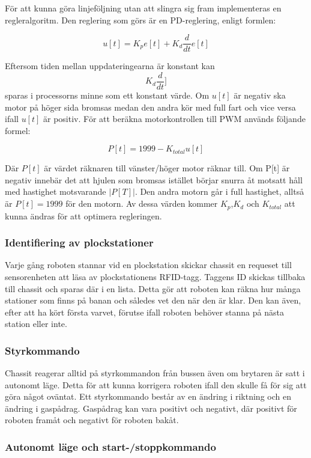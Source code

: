 För att kunna göra linjeföljning utan att slingra sig fram implementeras en regleralgoritm. Den reglering som görs är en PD-reglering, enligt formlen:

$$u[t] = K_{p}e[t] + K_{d}\frac{d}{dt}e[t]$$

Eftersom tiden mellan uppdateringearna är konstant kan $$ K_{d}\frac{d}{dt}]$$ sparas i processorns minne som ett konstant värde. Om $u[t]$ är negativ ska motor på höger sida  bromsas medan den andra kör med full fart och vice versa ifall $u[t]$ är positiv. För att beräkna motorkontrollen till PWM används följande formel:

$$P[t] = 1999 - K_{total}u[t]$$

Där $P[t]$ är värdet räknaren till vänster/höger motor räknar till. Om P[t] är negativ innebär det att hjulen som bromsas istället börjar snurra åt motsatt håll med hastighet motsvarande $|P[T]|$. Den andra motorn går i full hastighet, alltså är $P[t] = 1999$ för den motorn. Av dessa värden kommer $K_{p}$,$K_{d}$ och $K_{total}$ att kunna ändras för att optimera regleringen.


\subsubsection{Identifiering av plockstationer}

Varje gång roboten stannar vid en plockstation skickar chassit en requeset till sensorenheten att läsa av plockstationens RFID-tagg. Taggens ID skickas tillbaka till chassit och sparas där i en lista. Detta gör att roboten kan räkna hur många stationer som finns på banan och således vet den när den är klar. Den kan även, efter att ha kört första varvet, förutse ifall roboten behöver stanna på nästa station eller inte. 


\subsubsection{Styrkommando}

Chassit reagerar alltid på styrkommandon från bussen även om brytaren är satt i autonomt läge. Detta för att kunna korrigera roboten ifall den skulle få för sig att göra något oväntat. Ett styrkommando består av en ändring i riktning och en ändring i gaspådrag. Gaspådrag kan vara positivt och negativt, där positivt för roboten framåt och negativt för roboten bakåt. 


\subsubsection{Autonomt läge och start-/stoppkommando}

